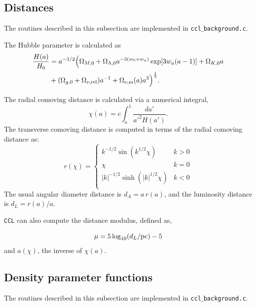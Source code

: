 \documentclass[\docopts]{\docclass}
\newcommand{\ccl}{{\tt CCL}\xspace}
\begin{document}
\subsection{Distances}
\label{sec:distances}

The routines described in this subsection are implemented in {\tt ccl$\_$background.c}.

The Hubble parameter is calculated as
%
\begin{align}\label{eq:Ha}
\frac{H(a)}{H_0} &= a^{-3/2}\Big(\Omega_{M,0}+\Omega_{\Lambda,0} a^{-3(w_0+w_a)}
    \exp[3 w_a (a-1)]+\Omega_{K,0} a \nonumber \\ &+(\Omega_{g,0} + \Omega_{\nu, {\rm rel}}) a^{-1} + \Omega_{\nu, {\rm m}}(a)a^3\Big)^{\frac{1}{2}}.
\end{align}

The radial comoving distance is calculated via a numerical integral,
\begin{equation}
 \chi(a)= c \int_a^1 \frac{da'}{a'^2 H(a')}.
\end{equation}
The transverse comoving distance is computed in terms of the radial comoving distance as:
\begin{equation}\label{eq:angdist}
 r(\chi)=\left\{\begin{array}{cc}
                 k^{-1/2}\sin(k^{1/2}\chi) & k>0\\
                 \chi & k=0\\
                 |k|^{-1/2}\sinh(|k|^{1/2}\chi) & k<0\\
                \end{array}\right.
\end{equation}
The usual angular diameter distance is $d_A=a\,r(a)$, and the luminosity distance is
$d_L=r(a)/a$.

\ccl can also compute the distance modulus, defined as,

\begin{equation}\label{eq:distmod}
    \mu = 5 \log_{10}(d_L / {\rm pc})-5
\end{equation}
and $a(\chi)$, the inverse of $\chi(a)$.


\subsection{Density parameter functions}
\label{subsec:densityparam}

The routines described in this subsection are implemented in {\tt ccl$\_$background.c}.
\end{document}
